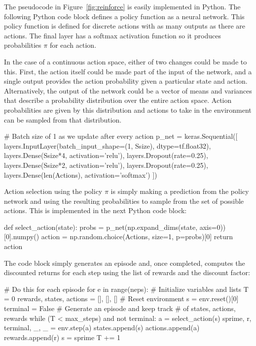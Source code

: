 \begin{withcode}
The pseudocode in Figure~\ref{fig:reinforce} is easily implemented in Python. The following Python code block defines a policy function as a neural network. This policy function is defined for discrete actions with as many outputs as there are actions. The final layer has a softmax activation function so it produces probabilities $\pi$ for each action.

\begin{infobox}
In the case of a continuous action space, either of two changes could be made to this. First, the action itself could be made part of the input of the network, and a single output provides the action probability given a particular state and action. Alternatively, the output of the network could be a vector of means and variances that describe a probability distribution over the entire action space. Action probabilities are given by this distribution and actions to take in the environment can be sampled from that distribution.
\end{infobox}

\begin{pythoncode}
# Batch size of 1 as we update after every action
p_net = keras.Sequential([
    layers.InputLayer(batch_input_shape=(1, Ssize), dtype=tf.float32),
    layers.Dense(Ssize*4, activation='relu'),
    layers.Dropout(rate=0.25),
    layers.Dense(Ssize*2, activation='relu'),
    layers.Dropout(rate=0.25),
    layers.Dense(len(Actions), activation='softmax')
])
\end{pythoncode}

Action selection using the policy $\pi$ is simply making a prediction from the policy network and using the resulting probabilities to sample from the set of possible actions. This is implemented in the next Python code block:

\begin{pythoncode}
def select_action(state):
    probs = p_net(np.expand_dims(state, axis=0))[0].numpy()
    action = np.random.choice(Actions, size=1, p=probs)[0]
    return action
\end{pythoncode}

The code block simply generates an episode and, once completed, computes the discounted returns for each step using the list of rewards and the discount factor:

\begin{pythoncode}
# Do this for each episode
for e in range(neps):
    # Initialize variables and lists
    T = 0
    rewards, states, actions = [], [], []
    # Reset environment
    s = env.reset()[0]
    terminal = False
    # Generate an episode and keep track
    # of states, actions, rewards
    while (T < max_steps) and not terminal:
        a = select_action(s)
        sprime, r, terminal, _, _ = env.step(a)
        states.append(s)
        actions.append(a)
        rewards.append(r)
        s = sprime
        T += 1


\end{pythoncode}
\end{withcode}
